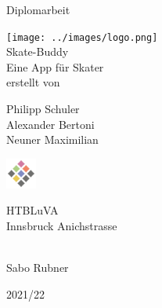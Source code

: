 \begin{titlepage}
	\begin{center}
		\Large{Diplomarbeit} \\

		\bigskip
		\bigskip
		\bigskip

		\texttt{[image: ../images/logo.png]} \\
		\Huge{Skate-Buddy} \\
		\bigskip
		\bigskip
		\bigskip
		\huge{Eine App für Skater} \\

		\bigskip
		\bigskip
		\bigskip
		\large{erstellt von} \\

		\bigskip
		\bigskip
		\bigskip

		\Huge{Philipp Schuler} \\
		\Huge{Alexander Bertoni} \\
		\Huge{Neuner Maximilian} \\
		\bigskip
		\bigskip
		\bigskip


		\bigskip
		\bigskip

		\includegraphics[width=1cm]{../images/htl-logo}

		\Large{HTBLuVA} \\
		\Large{Innsbruck Anichstrasse} \\

		\bigskip
		\bigskip
		\bigskip

		 \\
		Sabo Rubner

		\bigskip
		\bigskip
		\bigskip
		\bigskip

		\Large{2021/22}

	\end{center}

\end{titlepage}